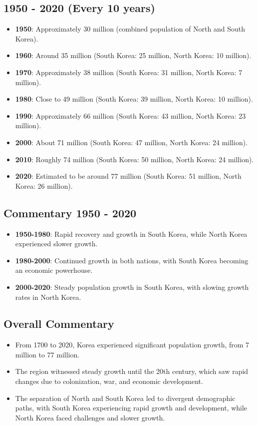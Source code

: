 \subsection*{1950 - 2020 (Every 10 years)}
\begin{itemize}
    \item \textbf{1950}: Approximately 30 million (combined population of North and South Korea).
    \item \textbf{1960}: Around 35 million (South Korea: 25 million, North Korea: 10 million).
    \item \textbf{1970}: Approximately 38 million (South Korea: 31 million, North Korea: 7 million).
    \item \textbf{1980}: Close to 49 million (South Korea: 39 million, North Korea: 10 million).
    \item \textbf{1990}: Approximately 66 million (South Korea: 43 million, North Korea: 23 million).
    \item \textbf{2000}: About 71 million (South Korea: 47 million, North Korea: 24 million).
    \item \textbf{2010}: Roughly 74 million (South Korea: 50 million, North Korea: 24 million).
    \item \textbf{2020}: Estimated to be around 77 million (South Korea: 51 million, North Korea: 26 million).
\end{itemize}

\subsection*{Commentary 1950 - 2020}
\begin{itemize}
    \item \textbf{1950-1980}: Rapid recovery and growth in South Korea, while North Korea experienced slower growth.
    \item \textbf{1980-2000}: Continued growth in both nations, with South Korea becoming an economic powerhouse.
    \item \textbf{2000-2020}: Steady population growth in South Korea, with slowing growth rates in North Korea.
\end{itemize}

\subsection*{Overall Commentary}
\begin{itemize}
    \item From 1700 to 2020, Korea experienced significant population growth, from 7 million to 77 million.
    \item The region witnessed steady growth until the 20th century, which saw rapid changes due to colonization, war, and economic development.
    \item The separation of North and South Korea led to divergent demographic paths, with South Korea experiencing rapid growth and development, while North Korea faced challenges and slower growth.
\end{itemize}